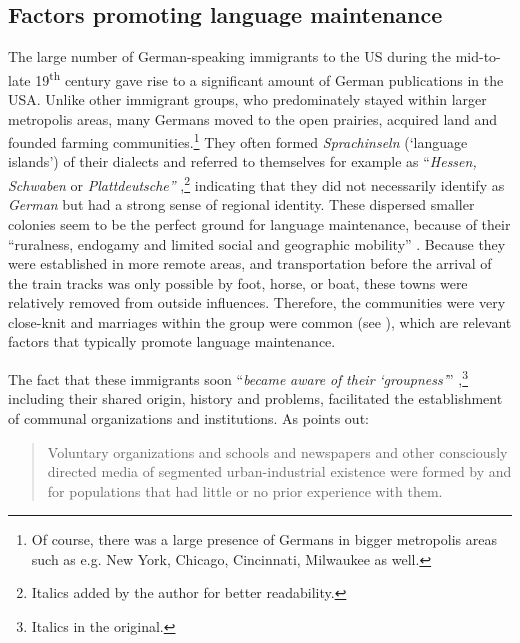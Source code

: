 \documentclass[output=paper]{langsci/langscibook}
\begin{document}
\subsection{Factors promoting language maintenance} %
\label{sec:rocker:2.1}

The large number of German-speaking immigrants to the US during the mid-to-late 19\textsuperscript{th} century gave rise to a significant amount of German publications in the USA. Unlike other immigrant groups, who predominately stayed within larger metropolis areas, many Germans moved to the open prairies, acquired land and founded farming communities.\footnote{Of course, there was a large presence of Germans in bigger metropolis areas such as e.g. New York, Chicago, Cincinnati, Milwaukee as well.} They often formed \textit{Sprachinseln} (‘language islands’) of their dialects and referred to themselves for example as “\textit{Hessen,} \textit{Schwaben} or \textit{Plattdeutsche”} \citep[501]{Langer2008},\footnote{Italics added by the author for better readability.} indicating that they did not necessarily identify as \textit{German} but had a strong sense of regional identity. These dispersed smaller colonies seem to be the perfect ground for language maintenance, because of their “ruralness, endogamy and limited social and geographic mobility” \citep[133]{Louden2006}. Because they were established in more remote areas, and transportation before the arrival of the train tracks was only possible by foot, horse, or boat, these towns were relatively removed from outside influences. Therefore, the communities were very close-knit and marriages within the group were common (see \citealt{Kehlenbeck1948}), which are relevant factors that typically promote language maintenance.

The fact that these immigrants soon “\textit{became} \textit{aware} \textit{of} \textit{their} \textit{‘groupness’}” \citep[27]{Fishman1966},\footnote{Italics in the original.} including their shared origin, history and problems, facilitated the establishment of communal organizations and institutions. As \citet[27]{Fishman1966} points out:

\begin{quote}
Voluntary organizations and schools and newspapers and other consciously directed media of segmented urban-industrial existence were formed by and for populations that had little or no prior experience with them.
\end{quote}
\end{document}
